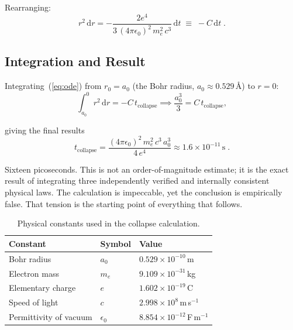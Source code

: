 Rearranging:
\begin{equation}
  r^2\,\mathrm{d}r = -\frac{2e^4}{3\,(4\pi\epsilon_0)^2\,m_e^2\,c^3}\,\mathrm{d}t \;\equiv\; -C\,\mathrm{d}t \; .
  \label{eq:ode}
\end{equation}

\subsection{Integration and Result}
\label{subsection:result}

Integrating~(\ref{eq:ode}) from $r_0 = a_0$ (the Bohr radius, $a_0 \approx 0.529\,\text{\AA}$) to $r = 0$:
\begin{equation}
  \int_{a_0}^{0} r^2\,\mathrm{d}r = -C\,t_{\mathrm{collapse}} \implies \frac{a_0^3}{3} = C\,t_{\mathrm{collapse}},
\end{equation}

giving the final results
\begin{equation}
  \boxed{t_{\mathrm{collapse}} = \frac{(4\pi\epsilon_0)^2\,m_e^2\,c^3\,a_0^3}{4\,e^4} \approx 1.6\times10^{-11}\,\mathrm{s} \; .}
  \label{eq:tcollapse}
\end{equation}

Sixteen picoseconds. This is not an order-of-magnitude estimate; it is the exact result of integrating three independently verified and internally consistent physical laws. The calculation is impeccable, yet the conclusion is empirically false. That tension is the starting point of everything that follows.

\begin{table}[h]
  \centering
  \begin{tabular}{|l|l|l|}
    \toprule
    Constant & Symbol & Value \\
    \midrule
    Bohr radius            & $a_0$        & $0.529\times10^{-10}$\,m \\
    Electron mass          & $m_e$        & $9.109\times10^{-31}$\,kg \\
    Elementary charge      & $e$          & $1.602\times10^{-19}$\,C \\
    Speed of light         & $c$          & $2.998\times10^{8}$\,m\,s$^{-1}$ \\
    Permittivity of vacuum & $\epsilon_0$ & $8.854\times10^{-12}$\,F\,m$^{-1}$ \\
    \bottomrule
  \end{tabular}
  \caption{Physical constants used in the collapse calculation.}
  \label{tab:constants}
\end{table}
